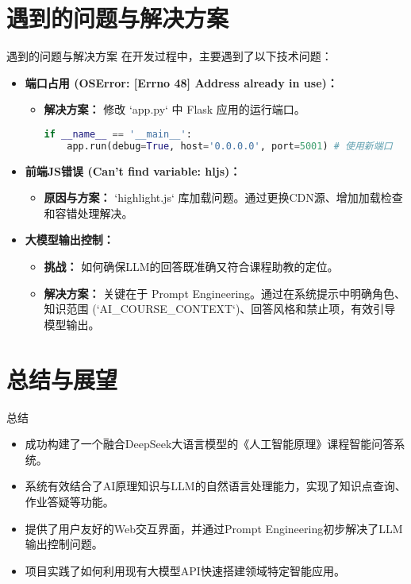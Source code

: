 \documentclass{beamer}
\begin{document}
\section{遇到的问题与解决方案}
\begin{frame}{遇到的问题与解决方案}
  在开发过程中，主要遇到了以下技术问题：
  \begin{itemize}
    \item \textbf{端口占用 (OSError: [Errno 48] Address already in use)：}
      \begin{itemize}
        \item \textbf{解决方案：} 修改 `app.py` 中 Flask 应用的运行端口。
          \begin{lstlisting}[language=Python, caption=修改端口示例, basicstyle=\ttfamily\tiny]
if __name__ == '__main__':
    app.run(debug=True, host='0.0.0.0', port=5001) # 使用新端口
          \end{lstlisting}
      \end{itemize}
    \item \textbf{前端JS错误 (Can't find variable: hljs)：}
      \begin{itemize}
        \item \textbf{原因与方案：} `highlight.js` 库加载问题。通过更换CDN源、增加加载检查和容错处理解决。
      \end{itemize}
    \item \textbf{大模型输出控制：}
      \begin{itemize}
        \item \textbf{挑战：} 如何确保LLM的回答既准确又符合课程助教的定位。
        \item \textbf{解决方案：} 关键在于 Prompt Engineering。通过在系统提示中明确角色、知识范围 (`AI_COURSE_CONTEXT`)、回答风格和禁止项，有效引导模型输出。
      \end{itemize}
  \end{itemize}
\end{frame}

\section{总结与展望}
\begin{frame}{总结}
  \begin{itemize}
    \item 成功构建了一个融合DeepSeek大语言模型的《人工智能原理》课程智能问答系统。
    \item 系统有效结合了AI原理知识与LLM的自然语言处理能力，实现了知识点查询、作业答疑等功能。
    \item 提供了用户友好的Web交互界面，并通过Prompt Engineering初步解决了LLM输出控制问题。
    \item 项目实践了如何利用现有大模型API快速搭建领域特定智能应用。
  \end{itemize}
\end{frame}
\end{document}
